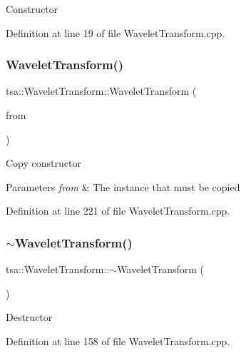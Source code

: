 Constructor 

Definition at line 19 of file Wavelet\+Transform.\+cpp.

\mbox{\label{classtsa_1_1_wavelet_transform_a1ce7211ad9ce11058575e94c15ca2c6e}} 
\subsubsection{\texorpdfstring{Wavelet\+Transform()}{WaveletTransform()}\hspace{0.1cm}{\footnotesize\ttfamily [2/2]}}
{\footnotesize\ttfamily tsa\+::\+Wavelet\+Transform\+::\+Wavelet\+Transform (\begin{DoxyParamCaption}\item[{const \hyperlink{classtsa_1_1_wavelet_transform}{Wavelet\+Transform} \&}]{from }\end{DoxyParamCaption})}

Copy constructor


\begin{DoxyParams}{Parameters}
{\em from} & The instance that must be copied \\
\hline
\end{DoxyParams}


Definition at line 221 of file Wavelet\+Transform.\+cpp.

\mbox{\label{classtsa_1_1_wavelet_transform_a119186776e4cc28d80d5d8d72cf12a5a}} 
\subsubsection{\texorpdfstring{$\sim$\+Wavelet\+Transform()}{~WaveletTransform()}}
{\footnotesize\ttfamily tsa\+::\+Wavelet\+Transform\+::$\sim$\+Wavelet\+Transform (\begin{DoxyParamCaption}{ }\end{DoxyParamCaption})}

Destructor 

Definition at line 158 of file Wavelet\+Transform.\+cpp.




